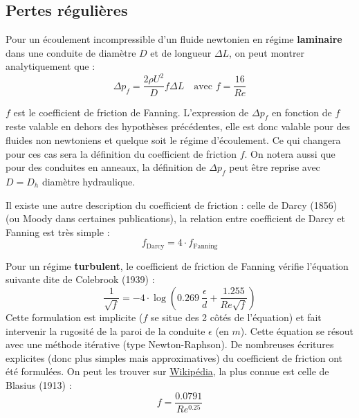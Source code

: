 \subsection{Pertes régulières}
%
\begin{center}
\end{center}
%
Pour un écoulement incompressible d'un fluide newtonien en régime \textbf{laminaire} dans une conduite de diamètre $D$ et de longueur $\Delta L$, on peut montrer analytiquement que :
%
\begin{equation}
\Delta p_f = \frac{2\rho U^2}{D} f \Delta L \quad\text{avec } f = \frac{16}{Re}
\end{equation}

$f$ est le coefficient de friction de Fanning. L'expression de $\Delta p_f$ en fonction de $f$ reste valable en dehors des hypothèses précédentes, elle est donc valable pour des fluides non newtoniens et quelque soit le régime d'écoulement. Ce qui changera pour ces cas sera la définition du coefficient de friction $f$. On notera aussi que pour des conduites en anneaux, la définition de $\Delta p_f$ peut être reprise avec $D = D_h$ diamètre hydraulique.

Il existe une autre description du coefficient de friction : celle de Darcy (1856) (ou Moody dans certaines publications), la relation entre coefficient de Darcy et Fanning est très simple :
%
\begin{equation}
f_{\text{Darcy}} = 4\cdot f_{\text{Fanning}}
\end{equation}

Pour un régime \textbf{turbulent}, le coefficient de friction de Fanning vérifie l'équation suivante dite de Colebrook (1939) :
%
\begin{equation}
\frac{1}{\sqrt{f}} = -4\cdot\log\left(0.269~\frac{\epsilon}{d} + \frac{1.255}{Re\sqrt{f}}\right)
\end{equation}
%
Cette formulation est implicite ($f$ se situe des 2 côtés de l'équation) et fait intervenir la rugosité de la paroi de la conduite $\epsilon$ (en $m$). Cette équation se résout avec une méthode itérative (type Newton-Raphson). De nombreuses écritures explicites (donc plus simples mais approximatives) du coefficient de friction ont été formulées. On peut les trouver sur \href{https://en.wikipedia.org/wiki/Darcy_friction_factor_formulae}{Wikipédia}, la plus connue est celle de Blasius (1913) :
%
\begin{equation}
f = \frac{0.0791}{Re^{0.25}}
\end{equation}
